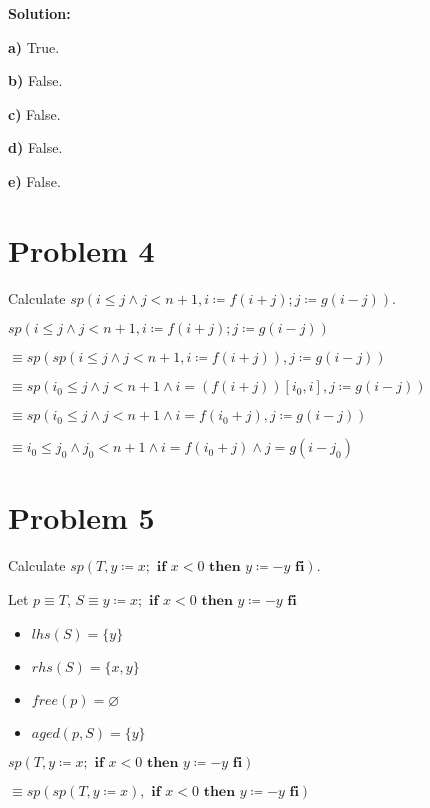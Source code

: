 \documentclass{article}
\begin{document}
\textbf{Solution: } 

\textbf{a)} True.

\textbf{b)} False.

\textbf{c)} False.

\textbf{d)} False.

\textbf{e)} False.


\section*{Problem 4}

Calculate $ sp(i \leq j \wedge j<n+1, i \coloneqq f(i+j);j \coloneqq g(i-j)) $.
\vspace{10pt}

$ sp(i \leq j \wedge j<n+1, i \coloneqq f(i+j);j \coloneqq g(i-j)) $

\qquad \qquad \qquad  $ \equiv sp(sp(i \leq j \wedge j<n+1, i \coloneqq f(i+j)),j \coloneqq g(i-j)) $

\qquad \qquad \qquad  $ \equiv sp(i_0 \leq j \wedge j<n+1 \wedge i=(f(i+j))[i_0,i],j \coloneqq g(i-j)) $

\qquad \qquad \qquad  $ \equiv sp(i_0 \leq j \wedge j<n+1 \wedge i=f(i_0+j),j \coloneqq g(i-j)) $

\qquad \qquad \qquad  $ \equiv i_0 \leq j_0 \wedge j_0<n+1 \wedge i=f(i_0+j) \wedge j=g(i-j_0) $


\section*{Problem 5}

Calculate $ sp(T, y \coloneqq x; \textbf{ if } x<0 \textbf{ then } y \coloneqq -y \textbf{ fi}) $.
\vspace{10pt}

Let $p \equiv T$, $ S \equiv y \coloneqq x; \textbf{ if } x<0 \textbf{ then } y \coloneqq -y \textbf{ fi} $

\begin{itemize}
\item $lhs(S)=\{y\}$
\item $rhs(S)=\{x,y\}$
\item $free(p)=\varnothing$
\item $aged(p,S)=\{y\}$
\end{itemize}

$ sp(T, y \coloneqq x; \textbf{ if } x<0 \textbf{ then } y \coloneqq -y \textbf{ fi}) $

\qquad \qquad \qquad  $ \equiv sp(sp(T, y \coloneqq x), \textbf{ if } x<0 \textbf{ then } y \coloneqq -y \textbf{ fi})$
\end{document}
